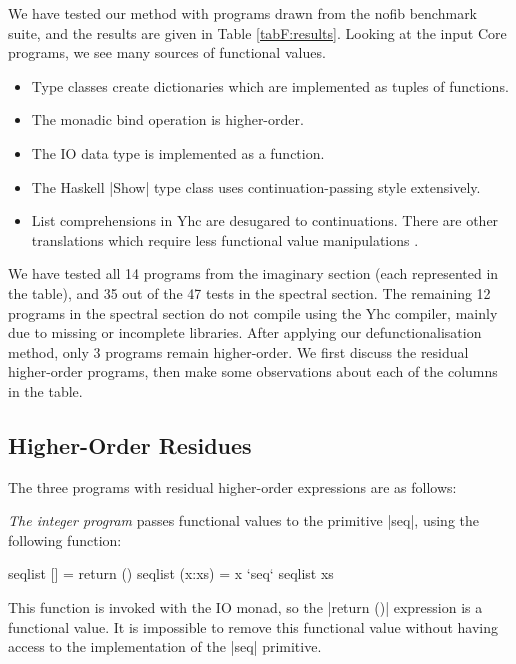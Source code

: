 We have tested our method with programs drawn from the nofib benchmark suite, and the results are given in Table \ref{tabF:results}. Looking at the input Core programs, we see many sources of functional values.

\begin{itemize}
\item Type classes create dictionaries which are implemented as tuples of functions.
\item The monadic bind operation is higher-order.
\item The IO data type is implemented as a function.
\item The Haskell |Show| type class uses continuation-passing style extensively.
\item List comprehensions in Yhc are desugared to continuations. There are other translations which require less functional value manipulations \cite{wadler:list_comprehensions,coutts:stream_fusion}.
\end{itemize}

We have tested all 14 programs from the imaginary section (each represented in the table), and 35 out of the 47 tests in the spectral section. The remaining 12 programs in the spectral section do not compile using the Yhc compiler, mainly due to missing or incomplete libraries. After applying our defunctionalisation method, only 3 programs remain higher-order. We first discuss the residual higher-order programs, then make some observations about each of the columns in the table.

\subsection{Higher-Order Residues}

The three programs with residual higher-order expressions are as follows:

\begin{example}
\textit{The integer program} passes functional values to the primitive |seq|, using the following function:

\begin{code}
seqlist [] = return ()
seqlist (x:xs) = x `seq` seqlist xs
\end{code}

This function is invoked with the IO monad, so the |return ()| expression is a functional value. It is impossible to remove this functional value without having access to the implementation of the |seq| primitive.
\end{example}

